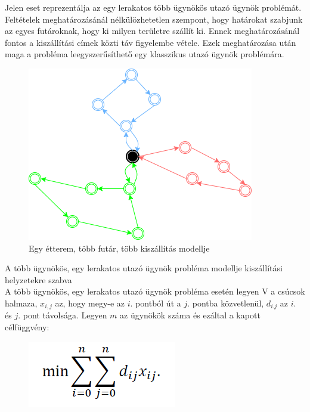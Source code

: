 

Jelen eset reprezentálja az egy lerakatos több ügynökös utazó ügynök problémát. Feltételek meghatározásánál nélkülözhetetlen szempont, hogy határokat szabjunk az egyes futároknak, hogy ki milyen területre szállít ki. Ennek meghatározásánál fontos a kiszállítási címek közti táv figyelembe vétele. Ezek meghatározása után maga a probléma leegyszerűsíthető egy klasszikus utazó ügynök problémára.

\begin{figure}[h!]
\centering
\includegraphics[scale=0.7]{images/Onedepotmtsp.png}
\caption{Egy étterem, több futár, több kiszállítás modellje}
\label{fig:model4}
\end{figure}


A több ügynökös, egy lerakatos utazó ügynök probléma modellje kiszállítási helyzetekre szabva\\

A több ügynökös, egy lerakatos utazó ügynök probléma esetén legyen V a csúcsok halmaza, $x_{i,j}$ az, hogy megy-e az $i.$ pontból út a $j.$ pontba közvetlenül, $d_{i.j}$ az $i.$ és $j.$ pont távolsága. Legyen $m$ az ügynökök száma és ezáltal a kapott célfüggvény:

\begin{figure}[h!]
\centering
\includegraphics[scale=0.5]{images/mtsp1.png}
\end{figure}

